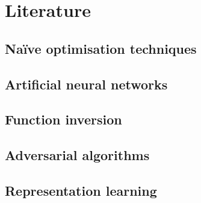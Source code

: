 \documentclass[../../main.tex]{subfiles}
\begin{document}
\chapter{Literature}

\section{Na\"{i}ve optimisation techniques}

\section{Artificial neural networks}

\section{Function inversion}

\section{Adversarial algorithms}

\section{Representation learning}
\end{document}
